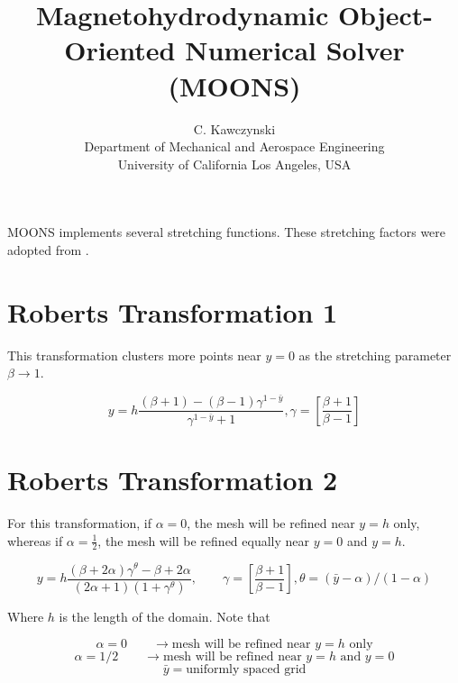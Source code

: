 \documentclass[11pt]{article}
\newcommand{\gammadef}{\left[\frac{\beta+1}{\beta-1}\right]}
\newcommand{\g}{\gamma}
\begin{document}
\doublespacing
\title{Magnetohydrodynamic Object-Oriented Numerical Solver (MOONS)}
\author{C. Kawczynski \\
Department of Mechanical and Aerospace Engineering \\
University of California Los Angeles, USA\\
}
\maketitle

MOONS implements several stretching functions. These stretching factors were adopted from \cite{pletcher2012computational}.

\section{Roberts Transformation 1}

This transformation clusters more points near $y=0$ as the stretching parameter $\beta \rightarrow 1$.

\begin{equation}
	y = h \frac{(\beta+1)-(\beta-1) \g^{1-\bar{y}} } {\g^{1-\bar{y}}+1}, \g = \gammadef
\end{equation}

\section{Roberts Transformation 2}
For this transformation, if $\alpha=0$, the mesh will be refined near $y=h$ only, whereas if $\alpha= \frac{1}{2}$, the mesh will be refined equally near $y=0$ and $y=h$.

\begin{equation} \label{eq:T2}
	y = h \frac{ (\beta + 2 \alpha) \g^{\theta} - \beta + 2 \alpha}
	{ (2\alpha+1) \left(1+\g^{\theta} \right) }
	, \qquad \g = \gammadef, \theta = (\bar{y}-\alpha)/(1-\alpha)
\end{equation}

Where $h$ is the length of the domain. Note that

\begin{equation}
	\alpha = 0 \qquad \rightarrow \text{mesh will be refined near $y=h$ only}
\end{equation}
\begin{equation}
	\alpha = 1/2 \qquad \rightarrow \text{mesh will be refined near $y=h$ and $y=0$}
\end{equation}
\begin{equation}
	\bar{y} = \text{uniformly spaced grid}
\end{equation}
\end{document}
